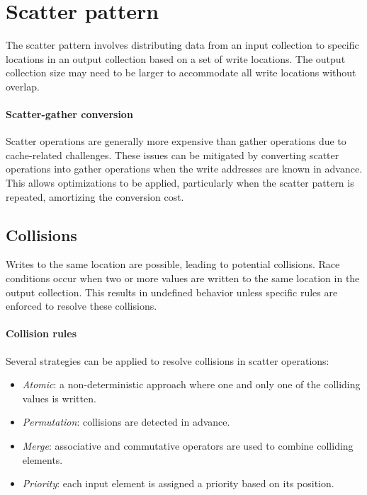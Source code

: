 \section{Scatter pattern}

The scatter pattern involves distributing data from an input collection to specific locations in an output collection based on a set of write locations. 
The output collection size may need to be larger to accommodate all write locations without overlap.

\paragraph*{Scatter-gather conversion}
Scatter operations are generally more expensive than gather operations due to cache-related challenges. 
These issues can be mitigated by converting scatter operations into gather operations when the write addresses are known in advance. 
This allows optimizations to be applied, particularly when the scatter pattern is repeated, amortizing the conversion cost.

\subsection{Collisions}
Writes to the same location are possible, leading to potential collisions.
Race conditions occur when two or more values are written to the same location in the output collection. 
This results in undefined behavior unless specific rules are enforced to resolve these collisions.

\paragraph*{Collision rules}
Several strategies can be applied to resolve collisions in scatter operations:
\begin{itemize}
    \item \textit{Atomic}: a non-deterministic approach where one and only one of the colliding values is written.
    \item \textit{Permutation}: collisions are detected in advance. 
    \item \textit{Merge}: associative and commutative operators are used to combine colliding elements.
    \item \textit{Priority}: each input element is assigned a priority based on its position.
\end{itemize}